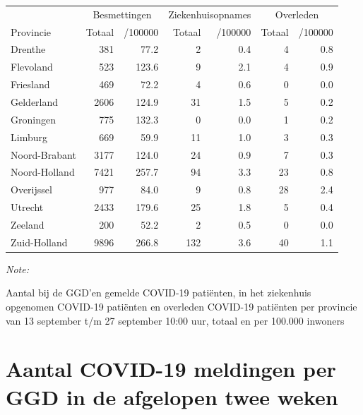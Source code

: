 \documentclass[
  english,
  man,floatsintext]{apa6}
\begin{document}
\begin{table}[H]
\centering
\begin{threeparttable}
\begin{tabular}{lrrrrrr}
\toprule
\multicolumn{1}{c}{ } & \multicolumn{2}{c}{Besmettingen} & \multicolumn{2}{c}{Ziekenhuisopnames} & \multicolumn{2}{c}{Overleden} \\
\cmidrule(l{3pt}r{3pt}){2-3} \cmidrule(l{3pt}r{3pt}){4-5} \cmidrule(l{3pt}r{3pt}){6-7}
Provincie & Totaal & /100000 & Totaal & /100000 & Totaal & /100000\\
\midrule
Drenthe & 381 & 77.2 & 2 & 0.4 & 4 & 0.8\\
Flevoland & 523 & 123.6 & 9 & 2.1 & 4 & 0.9\\
Friesland & 469 & 72.2 & 4 & 0.6 & 0 & 0.0\\
Gelderland & 2606 & 124.9 & 31 & 1.5 & 5 & 0.2\\
Groningen & 775 & 132.3 & 0 & 0.0 & 1 & 0.2\\
Limburg & 669 & 59.9 & 11 & 1.0 & 3 & 0.3\\
Noord-Brabant & 3177 & 124.0 & 24 & 0.9 & 7 & 0.3\\
Noord-Holland & 7421 & 257.7 & 94 & 3.3 & 23 & 0.8\\
Overijssel & 977 & 84.0 & 9 & 0.8 & 28 & 2.4\\
Utrecht & 2433 & 179.6 & 25 & 1.8 & 5 & 0.4\\
Zeeland & 200 & 52.2 & 2 & 0.5 & 0 & 0.0\\
Zuid-Holland & 9896 & 266.8 & 132 & 3.6 & 40 & 1.1\\
\bottomrule
\end{tabular}
\begin{tablenotes}
\item \textit{Note: } 
\item Aantal bij de GGD’en gemelde COVID-19 patiënten, in het ziekenhuis opgenomen COVID-19 patiënten en overleden COVID-19 patiënten per provincie van 13 september t/m 27 september 10:00 uur, totaal en per 100.000 inwoners
\end{tablenotes}
\end{threeparttable}
\end{table}

\newpage

\hypertarget{aantal-covid-19-meldingen-per-ggd-in-de-afgelopen-twee-weken}{%
\section{Aantal COVID-19 meldingen per GGD in de afgelopen twee weken}\label{aantal-covid-19-meldingen-per-ggd-in-de-afgelopen-twee-weken}}
\end{document}
